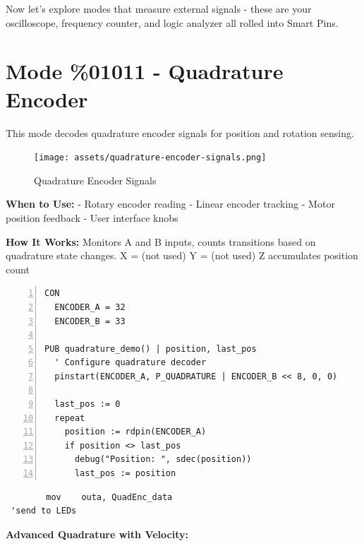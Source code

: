 \documentclass[11pt,a4paper,oneside,english]{book}
\begin{document}
Now let's explore modes that measure external signals - these are your
oscilloscope, frequency counter, and logic analyzer all rolled into
Smart Pins.

\clearpage

\hypertarget{mode-01011---quadrature-encoder}{%
\section{Mode \%01011 - Quadrature
Encoder}\label{mode-01011---quadrature-encoder}}

This mode decodes quadrature encoder signals for position and rotation
sensing.

\begin{figure}
\centering
\texttt{[image: assets/quadrature-encoder-signals.png]}
\caption{Quadrature Encoder Signals}
\end{figure}

\textbf{When to Use:} - Rotary encoder reading - Linear encoder tracking
- Motor position feedback - User interface knobs

\textbf{How It Works:} Monitors A and B inputs, counts transitions based
on quadrature state changes. X = (not used) Y = (not used) Z accumulates
position count

\begin{Spin2Block}
\begin{Verbatim}[numbers=left,numbersep=5pt,xleftmargin=15pt]
CON
  ENCODER_A = 32
  ENCODER_B = 33
  
PUB quadrature_demo() | position, last_pos
  ' Configure quadrature decoder
  pinstart(ENCODER_A, P_QUADRATURE | ENCODER_B << 8, 0, 0)
  
  last_pos := 0
  repeat
    position := rdpin(ENCODER_A)
    if position <> last_pos
      debug("Position: ", sdec(position))
      last_pos := position
\end{Verbatim}
\end{Spin2Block}

\begin{PASM2Block}
\begin{lstlisting}
        mov    outa, QuadEnc_data
 'send to LEDs
\end{lstlisting}
\end{PASM2Block}

\textbf{Advanced Quadrature with Velocity:}
\end{document}
